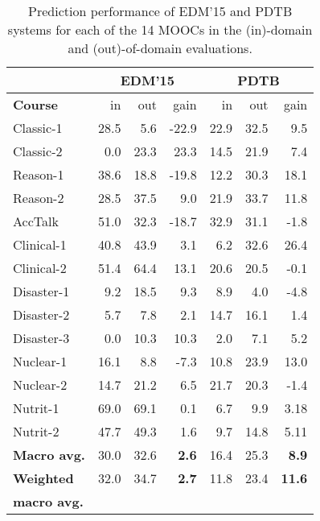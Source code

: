 \documentclass[letterpaper]{article}
\begin{document}
\begin{table}
\centering
\def\arraystretch{1.15}%
\small
\begin{tabular}{|l|r|r|r||r|r|r|}
\hline 
&
\multicolumn{3}{c||}{EDM'15} & 
\multicolumn{3}{c|}{PDTB}
\\
\hline
\bf Course&  in&  out & gain & in& out & gain\\
\hline
{\sc Classic-1} & 28.5& 5.6& -22.9& 22.9& 32.5& 9.5\\
\hline
{\sc Classic-2} & 0.0& 23.3& 23.3& 14.5& 21.9& 7.4\\
\hline
{\sc Reason-1} & 38.6& 18.8& -19.8& 12.2& 30.3& 18.1\\
\hline
{\sc Reason-2} & 28.5& 37.5& 9.0& 21.9& 33.7& 11.8\\
\hline
\hline
{\sc AccTalk} & 51.0& 32.3& -18.7& 32.9& 31.1& -1.8\\
\hline
{\sc Clinical-1} & 40.8& 43.9& 3.1& 6.2& 32.6& 26.4\\
\hline
{\sc Clinical-2} & 51.4& 64.4& 13.1& 20.6& 20.5& -0.1\\
\hline
{\sc Disaster-1} & 9.2& 18.5& 9.3& 8.9& 4.0& -4.8\\
\hline
{\sc Disaster-2} & 5.7& 7.8& 2.1&14.7 & 16.1& 1.4\\
\hline
{\sc Disaster-3} & 0.0& 10.3& 10.3&2.0 & 7.1& 5.2\\
\hline
{\sc Nuclear-1} & 16.1& 8.8& -7.3& 10.8& 23.9& 13.0\\
\hline
{\sc Nuclear-2} & 14.7& 21.2& 6.5& 21.7& 20.3& -1.4\\
\hline
{\sc Nutrit-1} & 69.0& 69.1& 0.1& 6.7& 9.9& 3.18\\
\hline
{\sc Nutrit-2} & 47.7& 49.3& 1.6& 9.7& 14.8& 5.11\\
\hline
\hline
\textbf{Macro avg.}& 30.0& 32.6& \textbf{2.6}& 16.4& 25.3& \textbf{8.9}\\
\hline
\textbf{Weighted} & 32.0& 34.7& \textbf{2.7}& 11.8& 23.4& \textbf{11.6}\\
\textbf{macro avg.}& & & & & &\\
\hline
\end{tabular}
\caption{Prediction performance of EDM'15 and PDTB 
systems for each of the 14 MOOCs in the (in)-domain 
and (out)-of-domain evaluations.}

\label{tab:pdtb-robust}
\end{table}
\end{document}
